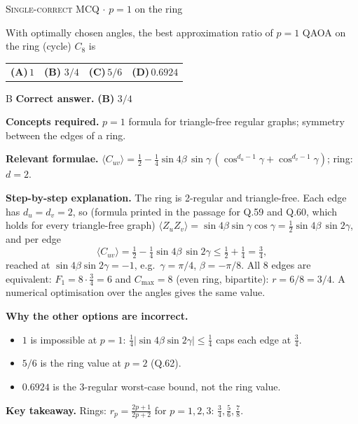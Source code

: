 \documentclass[11pt,a4paper]{article}
\newcommand{\optlabel}[1]{\textbf{(#1)}}
\newcommand{\correctlabel}[1]{\textcolor{okgreen}{\textbf{(#1)}\,\ding{51}}}
\newenvironment{qitem}[1]{\begin{list}{}{\setlength{\leftmargin}{3.3em}\setlength{\labelwidth}{3.1em}%
  \setlength{\labelsep}{0.2em}\setlength{\topsep}{3pt}\setlength{\parsep}{3pt}}\item[\textbf{Q.#1}\hfill]}{\end{list}}
\newcommand{\qsep}{\par\vspace{2pt}{\color{black!15}\hrule}\vspace{4pt}}
\newcommand{\qmeta}[2]{{\footnotesize\color{black!60}\textsc{#1} \;$\cdot$\; #2}\par}
\begin{document}
\begin{qitem}{48}
\qmeta{Single-correct MCQ}{$p = 1$ on the ring}
With optimally chosen angles, the best approximation ratio of $p = 1$ QAOA on the ring (cycle) $C_8$ is
\par\smallskip\noindent\begin{tabularx}{\linewidth}{@{}*{4}{L}@{}}
\optlabel{A}\,$1$ & \correctlabel{B}\,$3/4$ & \optlabel{C}\,$5/6$ & \optlabel{D}\,$0.6924$
\end{tabularx}
\end{qitem}
\begin{solbox}{B}
\textbf{\color{brand}Correct answer.} \textcolor{okgreen}{\textbf{(B)}} $3/4$

\textbf{\color{brand}Concepts required.} $p = 1$ formula for triangle-free regular graphs; symmetry between the edges of a ring.

\textbf{\color{brand}Relevant formulae.} $\langle C_{uv}\rangle = \tfrac12 - \tfrac14\sin4\beta\,\sin\gamma\,(\cos^{d_u-1}\gamma + \cos^{d_v-1}\gamma)$; ring: $d = 2$.

\textbf{\color{brand}Step-by-step explanation.} The ring is 2-regular and triangle-free. Each edge has $d_u = d_v = 2$, so (formula printed in the passage for Q.59 and Q.60,
which holds for every triangle-free graph) $\langle Z_uZ_v\rangle = \sin4\beta\sin\gamma\cos\gamma = \tfrac12\sin4\beta\,\sin2\gamma$, and per edge
\[ \langle C_{uv}\rangle = \tfrac12 - \tfrac14\sin4\beta\,\sin2\gamma \le \tfrac12 + \tfrac14 = \tfrac34, \]
reached at $\sin4\beta\sin2\gamma = -1$, e.g.\ $\gamma = \pi/4$, $\beta = -\pi/8$. All 8 edges are equivalent:
$F_1 = 8\cdot\tfrac34 = 6$ and $C_{\max} = 8$ (even ring, bipartite): $r = 6/8 = 3/4$. A numerical optimisation over the angles
gives the same value.

\textbf{\color{brand}Why the other options are incorrect.}
\begin{itemize}[leftmargin=2.4em, itemsep=1pt, topsep=2pt]
\item[\textbf{(A)}] $1$ is impossible at $p = 1$: $\frac14|\sin4\beta\sin2\gamma| \le \frac14$ caps each edge at $\frac34$.
\item[\textbf{(C)}] $5/6$ is the ring value at $p = 2$ (Q.62).
\item[\textbf{(D)}] $0.6924$ is the 3-regular worst-case bound, not the ring value.
\end{itemize}
\textbf{\color{brand}Key takeaway.} Rings: $r_p = \frac{2p+1}{2p+2}$ for $p = 1, 2, 3$: $\frac34, \frac56, \frac78$.
\end{solbox}
\qsep
\end{document}
